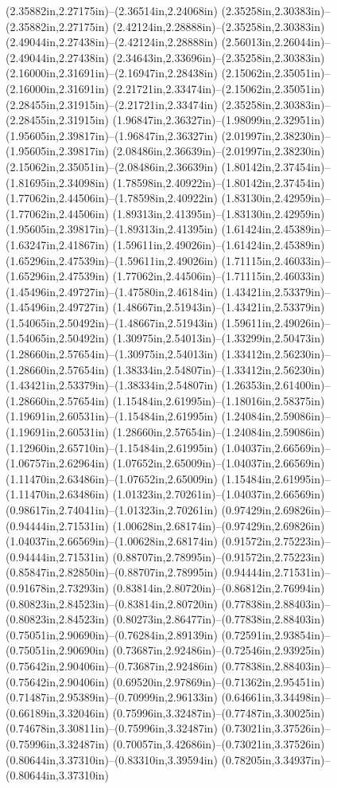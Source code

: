 (2.35882in,2.27175in)--(2.36514in,2.24068in) (2.35258in,2.30383in)--(2.35882in,2.27175in) (2.42124in,2.28888in)--(2.35258in,2.30383in) (2.49044in,2.27438in)--(2.42124in,2.28888in) (2.56013in,2.26044in)--(2.49044in,2.27438in) (2.34643in,2.33696in)--(2.35258in,2.30383in) (2.16000in,2.31691in)--(2.16947in,2.28438in) (2.15062in,2.35051in)--(2.16000in,2.31691in) (2.21721in,2.33474in)--(2.15062in,2.35051in) (2.28455in,2.31915in)--(2.21721in,2.33474in) (2.35258in,2.30383in)--(2.28455in,2.31915in) (1.96847in,2.36327in)--(1.98099in,2.32951in) (1.95605in,2.39817in)--(1.96847in,2.36327in) (2.01997in,2.38230in)--(1.95605in,2.39817in) (2.08486in,2.36639in)--(2.01997in,2.38230in) (2.15062in,2.35051in)--(2.08486in,2.36639in) (1.80142in,2.37454in)--(1.81695in,2.34098in) (1.78598in,2.40922in)--(1.80142in,2.37454in) (1.77062in,2.44506in)--(1.78598in,2.40922in) (1.83130in,2.42959in)--(1.77062in,2.44506in) (1.89313in,2.41395in)--(1.83130in,2.42959in) (1.95605in,2.39817in)--(1.89313in,2.41395in) (1.61424in,2.45389in)--(1.63247in,2.41867in) (1.59611in,2.49026in)--(1.61424in,2.45389in) (1.65296in,2.47539in)--(1.59611in,2.49026in) (1.71115in,2.46033in)--(1.65296in,2.47539in) (1.77062in,2.44506in)--(1.71115in,2.46033in) (1.45496in,2.49727in)--(1.47580in,2.46184in) (1.43421in,2.53379in)--(1.45496in,2.49727in) (1.48667in,2.51943in)--(1.43421in,2.53379in) (1.54065in,2.50492in)--(1.48667in,2.51943in) (1.59611in,2.49026in)--(1.54065in,2.50492in) (1.30975in,2.54013in)--(1.33299in,2.50473in) (1.28660in,2.57654in)--(1.30975in,2.54013in) (1.33412in,2.56230in)--(1.28660in,2.57654in) (1.38334in,2.54807in)--(1.33412in,2.56230in) (1.43421in,2.53379in)--(1.38334in,2.54807in) (1.26353in,2.61400in)--(1.28660in,2.57654in) (1.15484in,2.61995in)--(1.18016in,2.58375in) (1.19691in,2.60531in)--(1.15484in,2.61995in) (1.24084in,2.59086in)--(1.19691in,2.60531in) (1.28660in,2.57654in)--(1.24084in,2.59086in) (1.12960in,2.65710in)--(1.15484in,2.61995in) (1.04037in,2.66569in)--(1.06757in,2.62964in) (1.07652in,2.65009in)--(1.04037in,2.66569in) (1.11470in,2.63486in)--(1.07652in,2.65009in) (1.15484in,2.61995in)--(1.11470in,2.63486in) (1.01323in,2.70261in)--(1.04037in,2.66569in) (0.98617in,2.74041in)--(1.01323in,2.70261in) (0.97429in,2.69826in)--(0.94444in,2.71531in) (1.00628in,2.68174in)--(0.97429in,2.69826in) (1.04037in,2.66569in)--(1.00628in,2.68174in) (0.91572in,2.75223in)--(0.94444in,2.71531in) (0.88707in,2.78995in)--(0.91572in,2.75223in) (0.85847in,2.82850in)--(0.88707in,2.78995in) (0.94444in,2.71531in)--(0.91678in,2.73293in) (0.83814in,2.80720in)--(0.86812in,2.76994in) (0.80823in,2.84523in)--(0.83814in,2.80720in) (0.77838in,2.88403in)--(0.80823in,2.84523in) (0.80273in,2.86477in)--(0.77838in,2.88403in) (0.75051in,2.90690in)--(0.76284in,2.89139in) (0.72591in,2.93854in)--(0.75051in,2.90690in) (0.73687in,2.92486in)--(0.72546in,2.93925in) (0.75642in,2.90406in)--(0.73687in,2.92486in) (0.77838in,2.88403in)--(0.75642in,2.90406in) (0.69520in,2.97869in)--(0.71362in,2.95451in) (0.71487in,2.95389in)--(0.70999in,2.96133in) (0.64661in,3.34498in)--(0.66189in,3.32046in) (0.75996in,3.32487in)--(0.77487in,3.30025in) (0.74678in,3.30811in)--(0.75996in,3.32487in) (0.73021in,3.37526in)--(0.75996in,3.32487in) (0.70057in,3.42686in)--(0.73021in,3.37526in) (0.80644in,3.37310in)--(0.83310in,3.39594in) (0.78205in,3.34937in)--(0.80644in,3.37310in) 